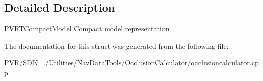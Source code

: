 \subsection{Detailed Description}


  \hyperlink{struct_p_v_r_t_compact_model}{P\+V\+R\+T\+Compact\+Model}  Compact model representation 

The documentation for this struct was generated from the following file\+:\begin{DoxyCompactItemize}
\item 
P\+V\+R/\+S\+D\+K\+\_./\+Utilities/\+Nav\+Data\+Tools/\+Occlusion\+Calculator/occlusioncalculator.\+cpp\end{DoxyCompactItemize}
